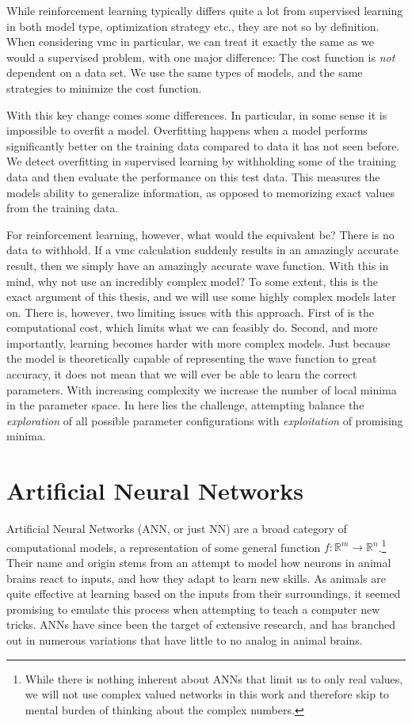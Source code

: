 \documentclass[Thesis.tex]{subfiles}
\begin{document}
While reinforcement learning typically differs quite a lot from supervised
learning in both model type, optimization strategy etc., they are not so by
definition. When considering \gls{vmc} in particular, we can treat it exactly the same
as we would a supervised problem, with one major difference: The cost function
is \emph{not} dependent on a data set. We use the same types of models, and the
same strategies to minimize the cost function.

With this key change comes some differences. In particular, in some sense it
is impossible to overfit a model. Overfitting happens when a model performs
significantly better on the training data compared to data it has not seen
before. We detect overfitting in supervised learning by withholding some of
the training data and then evaluate the performance on this test data. This
measures the models ability to generalize information, as opposed to memorizing
exact values from the training data.

For reinforcement learning, however, what would the equivalent be? There is no
data to withhold. If a \gls{vmc} calculation suddenly results in an amazingly accurate
result, then we simply have an amazingly accurate wave function. With this in
mind, why not use an incredibly complex model? To some extent, this is the exact
argument of this thesis, and we will use some highly complex models later on.
There is, however, two limiting issues with this approach. First of is the
computational cost, which limits what we can feasibly do. Second, and more
importantly, learning becomes harder with more complex models. Just because the
model is theoretically capable of representing the wave function to great
accuracy, it does not mean that we will ever be able to learn the correct
parameters. With increasing complexity we increase the number of local
minima in the parameter space. In here lies the challenge, attempting balance
the \emph{exploration} of all possible parameter configurations with \emph{exploitation} of
promising minima.


\section{Artificial Neural Networks}
\label{sec:artificial-neural-networks}

Artificial Neural Networks (ANN, or just NN) are a broad category of
computational models, a representation of some general function $f:
\mathbb{R}^m\to\mathbb{R}^n$.\footnote{While there is nothing inherent about
  ANNs that limit us to only real values, we will not use
  complex valued networks in this work and therefore skip to mental burden of
  thinking about the complex numbers.} Their name and origin stems from an attempt to
model how neurons in animal brains react to inputs, and how they adapt to learn
new skills. As animals are quite effective at learning based on the inputs from
their surroundings, it seemed promising to emulate this
process when attempting to teach a computer new tricks. ANNs have since been the
target of extensive research, and has branched out in numerous variations that
have little to no analog in animal brains.
\end{document}
